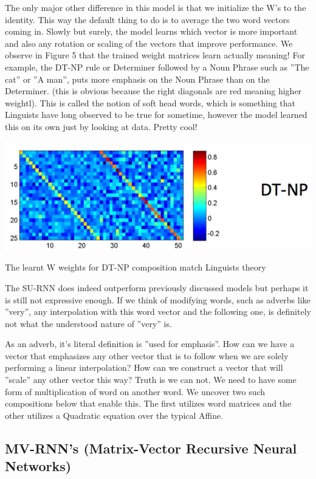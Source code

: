 \documentclass{tufte-handout}
\begin{document}
The only major other difference in this model is that we initialize the W's to the identity. This way the default thing to do is to average the two word vectors coming in. Slowly but surely, the model learns which vector is more important and also any rotation or scaling of the vectors that improve performance. We observe in Figure 5 that the trained weight matrices learn actually meaning!  For example, the DT-NP rule or Determiner followed by a Noun Phrase such as ''The cat'' or ''A man'', puts more emphasis on the Noun Phrase than on the Determiner. (this is obvious because the right diagonals are red meaning higher weightl). This is called the notion of soft head words, which is something that Linguists have long observed to be true for sometime, however the model learned this on its own just by looking at data. Pretty cool!

\begin{marginfigure}%
  \includegraphics[width=\linewidth]{img5}
  \caption{The learnt W weights for DT-NP composition match Linguists theory }
  \label{fig:img5}
\end{marginfigure}

The SU-RNN does indeed outperform previously discussed models but perhaps it is still not expressive enough. If we think of modifying words, such as adverbs like ''very'', any interpolation with this word vector and the following one, is definitely not what the understood nature of ''very'' is.

As an adverb, it's literal definition is ''used for emphasis''. How can we have a vector that emphasizes any other vector that is to follow when we are solely performing a linear interpolation? How can we construct a vector that will ''scale'' any other vector this way? Truth is we can not. We need to have some form of multiplication of word on another word. We uncover two such compositions below that enable this. The first utilizes word matrices and the other utilizes a Quadratic equation over the typical Affine.


\subsection{MV-RNN's (Matrix-Vector Recursive Neural Networks)}
\end{document}

